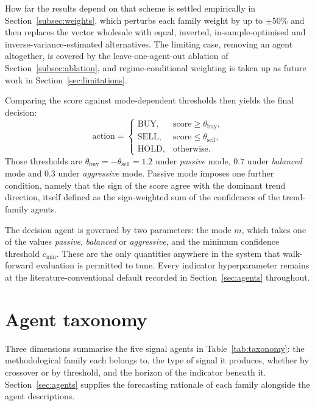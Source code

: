 How far the results depend on that scheme is settled empirically in Section~\ref{subsec:weights}, which perturbs each family weight by up to $\pm 50\%$ and then replaces the vector wholesale with equal, inverted, in-sample-optimised and inverse-variance-estimated alternatives. The limiting case, removing an agent altogether, is covered by the leave-one-agent-out ablation of Section~\ref{subsec:ablation}, and regime-conditional weighting is taken up as future work in Section~\ref{sec:limitations}.

Comparing the score against mode-dependent thresholds then yields the final decision:
\begin{equation}
\mathrm{action} =
\begin{cases}
\mathrm{BUY}, & \mathrm{score} \geq \theta_\text{buy}, \\
\mathrm{SELL}, & \mathrm{score} \leq \theta_\text{sell}, \\
\mathrm{HOLD}, & \mathrm{otherwise}.
\end{cases}
\label{eq:decision_rule}
\end{equation}
Those thresholds are $\theta_\text{buy} = -\theta_\text{sell} = 1.2$ under \emph{passive} mode, $0.7$ under \emph{balanced} mode and $0.3$ under \emph{aggressive} mode. Passive mode imposes one further condition, namely that the sign of the score agree with the dominant trend direction, itself defined as the sign-weighted sum of the confidences of the trend-family agents.

The decision agent is governed by two parameters: the mode $m$, which takes one of the values \emph{passive}, \emph{balanced} or \emph{aggressive}, and the minimum confidence threshold $c_{\min}$. These are the only quantities anywhere in the system that walk-forward evaluation is permitted to tune. Every indicator hyperparameter remains at the literature-conventional default recorded in Section~\ref{sec:agents} throughout.

\section{Agent taxonomy}\label{subsec:taxonomy}

Three dimensions summarise the five signal agents in Table~\ref{tab:taxonomy}: the methodological family each belongs to, the type of signal it produces, whether by crossover or by threshold, and the horizon of the indicator beneath it. Section~\ref{sec:agents} supplies the forecasting rationale of each family alongside the agent descriptions.

